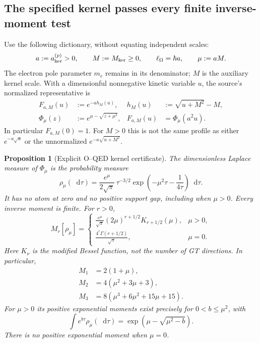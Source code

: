 \documentclass[final,5p,times,twocolumn,numbers,nopreprintline]{elsarticle}
\numberwithin{equation}{section}
\newtheorem{proposition}[theorem]{Proposition}
\theoremstyle{definition}
\theoremstyle{remark}
\newcommand{\dd}{\mathop{}\!\mathrm d}
\newcommand{\Ph}{\Phi}
\begin{document}
\subsection{The specified kernel passes every finite inverse-moment test}
\label{sec:OQED-moments}

Use the following dictionary, without equating independent scales:
\[
 a:=a_{\rm ker}^{(p)}>0,\qquad M:=M_{\rm ker}\geq0,\qquad
 \ell_\Omega=\hbar a,\qquad \mu:=aM.
\]
The electron pole parameter \(m_e\) remains in its denominator;
\(M\) is the auxiliary kernel scale. With a dimensionful nonnegative
kinetic variable \(u\), the source's normalized representative is
\begin{equation}
\begin{aligned}
 F_{a,M}(u)&:=e^{-a h_M(u)},&
 h_M(u)&:=\sqrt{u+M^2}-M,\\
 \Ph_\mu(z)&:=e^{\mu-\sqrt{z+\mu^2}},&
 F_{a,M}(u)&=\Ph_\mu(a^2u).
\end{aligned}
\label{eq:OQED-normalized-kernel}
\end{equation}
In particular \(F_{a,M}(0)=1\). For \(M>0\) this is not the same
profile as either \(e^{-a\sqrt u}\) or the unnormalized
\(e^{-a\sqrt{u+M^2}}\).

\begin{proposition}[Explicit O--QED kernel certificate]
\label{prop:OQED-moment-certificate}
The dimensionless Laplace measure of \(\Ph_\mu\) is the probability
measure
\begin{equation}
 \rho_\mu(\dd\tau)=\frac{e^\mu}{2\sqrt\pi}\,
 \tau^{-3/2}\exp\!\left(-\mu^2\tau-\frac1{4\tau}\right)\dd\tau.
\label{eq:OQED-dimensionless-measure}
\end{equation}
It has no atom at zero and no positive support gap, including when
\(\mu>0\). Every inverse moment is finite. For \(r>0\),
\begin{equation}
 M_r[\rho_\mu]=
 \begin{cases}
 \displaystyle\frac{e^\mu}{\sqrt\pi}(2\mu)^{r+1/2}
                      K_{r+1/2}(\mu),&\mu>0,\\[2pt]
 \displaystyle\frac{4^r\Gamma(r+1/2)}{\sqrt\pi},&\mu=0.
 \end{cases}
\label{eq:OQED-inverse-moments}
\end{equation}
Here \(K_\nu\) is the modified Bessel function, not the number of GT
directions. In particular,
\begin{equation}
\begin{aligned}
 M_1&=2(1+\mu),\\
 M_2&=4(\mu^2+3\mu+3),\\
 M_3&=8(\mu^3+6\mu^2+15\mu+15).
\end{aligned}
\label{eq:OQED-first-moments}
\end{equation}
For \(\mu>0\) its positive exponential moments exist precisely for
\(0<b\leq\mu^2\), with
\begin{equation}
 \int e^{b\tau}\rho_\mu(\dd\tau)
       =\exp\!\left(\mu-\sqrt{\mu^2-b}\right).
\label{eq:OQED-exponential-moment}
\end{equation}
There is no positive exponential moment when \(\mu=0\).
\end{proposition}
\end{document}
